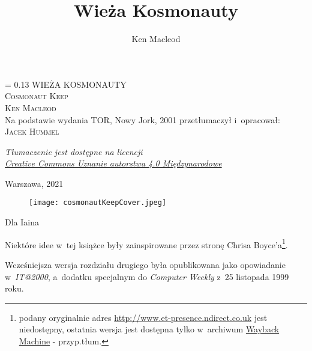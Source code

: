 \documentclass[oneside,polish,12pt,sfheadings]{mwbk}
\begin{document}
\title{Wieża Kosmonauty}
\author{Ken Macleod}

\DeclareRobustCommand{\cs}[1]{\texttt{\char`\\#1}}
\newlength{\tpheight}\setlength{\tpheight}{0.9\textheight}
\newlength{\txtheight}\setlength{\txtheight}{0.9\tpheight}
\newlength{\tpwidth}\setlength{\tpwidth}{0.9\textwidth}
\newlength{\txtwidth}\setlength{\txtwidth}{0.9\tpwidth}
\newlength{\drop}
\newcommand*{\titleSI}{\begingroup%
\drop = 0.13\txtheight
\centering
\vspace*{\drop}
{\Huge WIEŻA KOSMONAUTY}\\[1\baselineskip]
{\huge \textsc{Cosmonaut Keep}}\\[2\baselineskip]
{\huge \textsc{Ken Macleod}}\\[4\baselineskip]

{\large Na podstawie wydania TOR, Nowy Jork, 2001 przetłumaczył i~opracował:}\\[1\baselineskip]
{\large \textsc{Jacek Hummel}}\\[3\baselineskip]
{\normalsize \textit{Tłumaczenie jest dostępne na licencji\\
\href{https://creativecommons.org/licenses/by/4.0/deed.pl}{Creative Commons Uznanie autorstwa 4.0 Międzynarodowe}}\par}

\vfill
{\Large {Warszawa, 2021}}\\
\vspace*{\drop}
\endgroup}
\titleSI
\thispagestyle{empty}
\newpage
\begin{figure}[ht!]
\centering
\texttt{[image: cosmonautKeepCover.jpeg]}
\end{figure}


\newpage


Dla Iaina

Niektóre idee w~tej książce były zainspirowane przez stronę Chrisa
Boyce'a\footnote{podany oryginalnie adres \href{http://www.et-presence.ndirect.co.uk}{http://www.et-presence.ndirect.co.uk} jest niedostępny, ostatnia wersja jest dostępna tylko w~archiwum \href{https://web.archive.org/web/20020915000000*/http://www.et-presence.ndirect.co.uk}{Wayback Machine} - przyp.tłum.}.

Wcześniejsza wersja rozdziału drugiego była opublikowana jako
opowiadanie\\ w~\emph{IT@2000}, a~dodatku specjalnym do \emph{Computer
Weekly} z~25 listopada 1999 roku.
\end{document}
